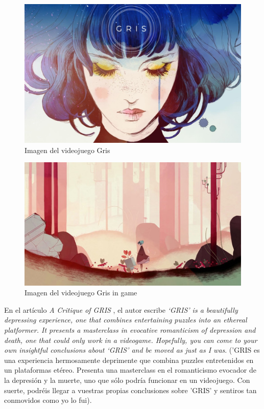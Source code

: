 \documentclass[12pt, a4paper,twoside,titlepage]{book}
\begin{document}
\begin{figure}
	\centering
	\includegraphics[scale=.4]{Imagenes videojuegos/gris.jpeg}
	\caption{Imagen del videojuego Gris}
	\label{img:gris}
\end{figure}
\begin{figure}
	\centering
	\includegraphics[scale=.7]{Imagenes videojuegos/gris2.jpg}
	\caption{Imagen del videojuego Gris in game}
	\label{img:gris2}
\end{figure}


En el artículo \textit{A Critique of GRIS} \cite{critiquegris}, el autor escribe \textit{ ‘GRIS’ is a beautifully depressing experience, one that combines entertaining puzzles into an ethereal platformer. It presents a masterclass in evocative romanticism of depression and death, one that could only work in a videogame. Hopefully, you can come to your own insightful conclusions about ‘GRIS’ and be moved as just as I was}. ('GRIS es una experiencia hermosamente deprimente que combina puzzles entretenidos en un plataformas etéreo. Presenta una masterclass en el romanticismo evocador de la depresión y la muerte, uno que sólo podría funcionar en un videojuego. Con suerte, podréis llegar a vuestras propias conclusiones sobre 'GRIS' y sentiros tan conmovidos como yo lo fui). 
\end{document}
